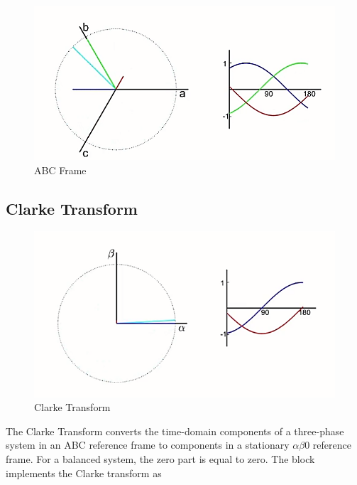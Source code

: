 \documentclass[12pt,a4paper]{book}
\begin{document}
\begin{figure}[h]
  \centering
  \includegraphics[width=12cm]{image16.png}
  \caption{ABC Frame}
  \label{fig:image16}
\end{figure}

\subsection{Clarke Transform}

\begin{figure}[h]
  \centering
  \includegraphics[width=12cm]{image17.png}
  \caption{Clarke Transform}
  \label{fig:image17}
\end{figure}

The Clarke Transform converts the time-domain components of a three-phase system in an ABC reference frame to components in a stationary \(\alpha\beta\)0 reference frame. For a balanced system, the zero part is equal to zero. The block implements the Clarke transform as
\end{document}
